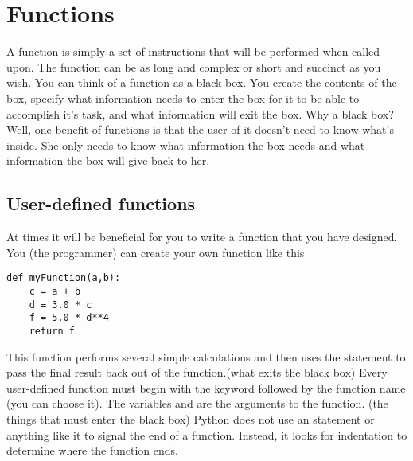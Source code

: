 
\section{Functions}
A function is simply a set of instructions that will be performed when
called upon.  The function can be as long and complex or short and
succinct as you wish.  You can think of a function as a black box. You
create the contents of the box, specify what information needs to
enter the box for it to be able to accomplish it's task, and what
information will exit the box.  Why a black box?  Well, one benefit of
functions is that the user of it doesn't need to know what's inside.
She only needs to know what information the box needs and what
information the box will give back to her.

\subsection*{User-defined functions}
At times it will be beneficial for you to write a function that you
have designed.  You (the programmer) can create your own function like
this
\begin{Verbatim}
def myFunction(a,b):
    c = a + b
    d = 3.0 * c
    f = 5.0 * d**4
    return f
\end{Verbatim}
This function performs several simple calculations and then uses the
 statement to pass the final result back out of the
function.(what exits the black box) Every user-defined function must
begin with the keyword  followed by the function name (you
can choose it). The variables  and  are the
arguments to the function. (the things that must enter the black box)
Python does not use an  statement or anything like it to
signal the end of a function.  Instead, it looks for indentation to
determine where the function ends.

